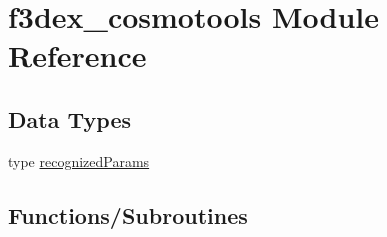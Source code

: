 \hypertarget{namespacef3dex__cosmotools}{
\section{f3dex\_\-cosmotools Module Reference}
\label{namespacef3dex__cosmotools}
}
\subsection*{Data Types}
\begin{DoxyCompactItemize}
\item 
type \hyperlink{typef3dex__cosmotools_1_1recognized_params}{recognizedParams}
\end{DoxyCompactItemize}
\subsection*{Functions/Subroutines}
